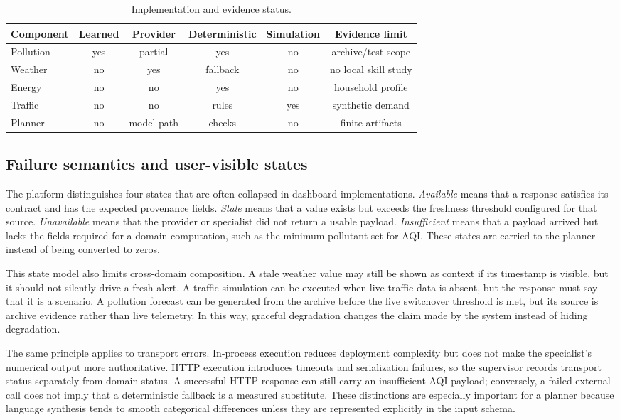 \documentclass[conference]{IEEEtran}
\begin{document}
\begin{table}[t]
\caption{Implementation and evidence status.}
\label{tab:status}
\centering\scriptsize
\begin{tabular}{@{}lccccc@{}}
\toprule
Component & Learned & Provider & Deterministic & Simulation & Evidence limit\\
\midrule
Pollution & yes & partial & yes & no & archive/test scope\\
Weather & no & yes & fallback & no & no local skill study\\
Energy & no & no & yes & no & household profile\\
Traffic & no & no & rules & yes & synthetic demand\\
Planner & no & model path & checks & no & finite artifacts\\
\bottomrule
\end{tabular}
\end{table}

\subsection{Failure semantics and user-visible states}
The platform distinguishes four states that are often collapsed in dashboard implementations. \emph{Available} means that a response satisfies its contract and has the expected provenance fields. \emph{Stale} means that a value exists but exceeds the freshness threshold configured for that source. \emph{Unavailable} means that the provider or specialist did not return a usable payload. \emph{Insufficient} means that a payload arrived but lacks the fields required for a domain computation, such as the minimum pollutant set for AQI. These states are carried to the planner instead of being converted to zeros.

This state model also limits cross-domain composition. A stale weather value may still be shown as context if its timestamp is visible, but it should not silently drive a fresh alert. A traffic simulation can be executed when live traffic data is absent, but the response must say that it is a scenario. A pollution forecast can be generated from the archive before the live switchover threshold is met, but its source is archive evidence rather than live telemetry. In this way, graceful degradation changes the claim made by the system instead of hiding degradation.

The same principle applies to transport errors. In-process execution reduces deployment complexity but does not make the specialist's numerical output more authoritative. HTTP execution introduces timeouts and serialization failures, so the supervisor records transport status separately from domain status. A successful HTTP response can still carry an insufficient AQI payload; conversely, a failed external call does not imply that a deterministic fallback is a measured substitute. These distinctions are especially important for a planner because language synthesis tends to smooth categorical differences unless they are represented explicitly in the input schema.
\end{document}
